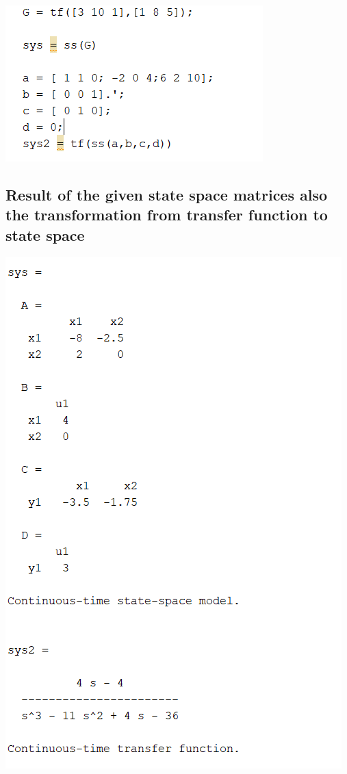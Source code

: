 \documentclass[12pt]{article}
\begin{document}
\includegraphics[scale=0.4]{HW1_problem_code.png}\\

\subsection{Result of the given state space matrices also the transformation from transfer function to state space}

\includegraphics[scale=1]{HW1_problem_result.png}\\
\end{document}
